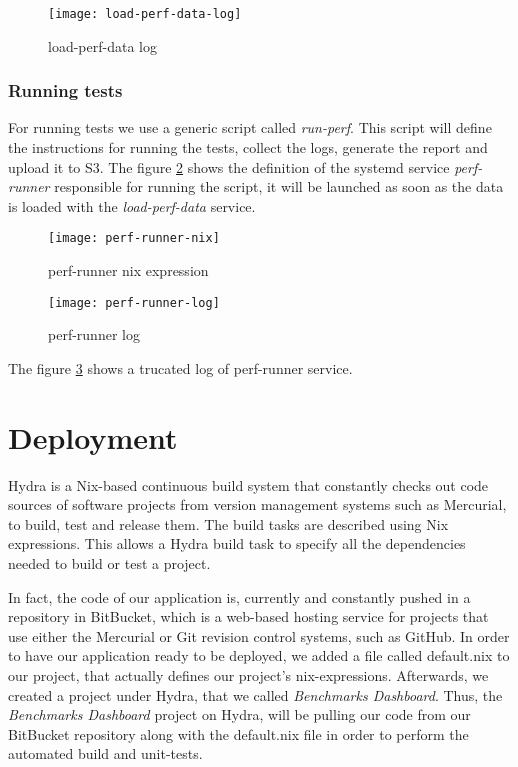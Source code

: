 \begin{figure}[h]
  \centerline{\texttt{[image: load-perf-data-log]}}
\caption{load-perf-data log}
\label{fig:load-perf-data-log}
\end{figure}

\subsubsection{Running tests}
For running tests we use a generic script called \emph{run-perf}. This script will
define the instructions for running the tests, collect the logs, generate the
report and upload it to S3. The figure
\hyperref[fig:perf-runner-nix]{\ref{fig:perf-runner-nix}} shows the definition of
the systemd service \emph{perf-runner} responsible for running the script, it
will be launched as soon as the data is loaded with the \emph{load-perf-data}
service.
\begin{figure}[h]
  \texttt{[image: perf-runner-nix]}
  \caption{perf-runner nix expression}
\label{fig:perf-runner-nix}
\end{figure}

\begin{figure}[h]
  \texttt{[image: perf-runner-log]}
  \caption{perf-runner log}
\label{fig:perf-runner-log}
\end{figure}
The figure \hyperref[fig:perf-runner-log]{\ref{fig:perf-runner-log}} shows a
trucated log of perf-runner service.

\section{Deployment}
Hydra is a Nix-based continuous build system that constantly checks out code
sources of software projects from version management systems such as Mercurial,
to build, test and release them. The build tasks are described using Nix
expressions. This allows a Hydra build task to specify all the dependencies
needed to build or test a project.

In fact, the code of our application is, currently and constantly pushed in a
repository in BitBucket, which is a web-based hosting service for projects that
use either the Mercurial or Git revision control systems, such as GitHub. In
order to have our application ready to be deployed, we added a file called
default.nix to our project, that actually defines our project’s nix-expressions.
Afterwards, we created a project under Hydra, that we called \emph{Benchmarks
  Dashboard}. Thus, the \emph{Benchmarks Dashboard} project on Hydra, will be
pulling our code from our BitBucket repository along with the default.nix file
in order to perform the automated build and unit-tests.

